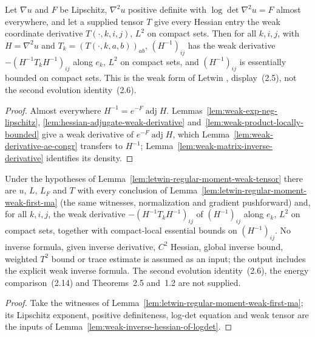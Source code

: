 \begin{lemma}
  \label{lem:weak-inverse-hessian-of-logdet}
  \leanok
  Let $\nabla u$ and $F$ be Lipschitz, $\nabla^2u$ positive definite with $\log\det\nabla^2u=F$ almost everywhere, and let a supplied
  tensor $T$ give every Hessian entry the weak coordinate derivative $T(\cdot,k,i,j)$, $L^2$ on compact sets. Then for all $k,i,j$,
  with $H=\nabla^2u$ and $T_k=(T(\cdot,k,a,b))_{ab}$, $(H^{-1})_{ij}$ has the weak derivative $-(H^{-1}T_kH^{-1})_{ij}$ along $e_k$,
  $L^2$ on compact sets, and $(H^{-1})_{ij}$ is essentially bounded on compact sets. This is the weak form of Letwin
  \cite{Letwin2026QuadraticKLS}, display~(2.5), not the second evolution identity~(2.6).
\end{lemma}
\begin{proof}
  \leanok
  Almost everywhere $H^{-1}=e^{-F}\operatorname{adj}H$. Lemmas~\ref{lem:weak-exp-neg-lipschitz},
  \ref{lem:hessian-adjugate-weak-derivative} and~\ref{lem:weak-product-locally-bounded} give a weak derivative of $e^{-F}\operatorname{adj}H$,
  which Lemma~\ref{lem:weak-derivative-ae-congr} transfers to $H^{-1}$; Lemma~\ref{lem:weak-matrix-inverse-derivative} identifies its
  density.
\end{proof}

\begin{lemma}
  \label{lem:letwin-regular-moment-weak-inverse}
  \leanok
  Under the hypotheses of Lemma~\ref{lem:letwin-regular-moment-weak-tensor} there are $u$, $L$, $L_F$ and $T$ with every conclusion of
  Lemma~\ref{lem:letwin-regular-moment-weak-first-ma} (the same witnesses, normalization and gradient pushforward) and, for all
  $k,i,j$, the weak derivative $-(H^{-1}T_kH^{-1})_{ij}$ of $(H^{-1})_{ij}$ along $e_k$, $L^2$ on compact sets, together with
  compact-local essential bounds on $(H^{-1})_{ij}$. No inverse formula, given inverse derivative, $C^2$ Hessian, global inverse bound,
  weighted $T^2$ bound or trace estimate is assumed as an input; the output includes the explicit weak inverse formula. The second
  evolution identity~(2.6), the energy comparison~(2.14) and
  Theorems~2.5 and~1.2 are not supplied.
\end{lemma}
\begin{proof}
  \leanok
  Take the witnesses of Lemma~\ref{lem:letwin-regular-moment-weak-first-ma}; its Lipschitz exponent, positive definiteness, log-det
  equation and weak tensor are the inputs of Lemma~\ref{lem:weak-inverse-hessian-of-logdet}.
\end{proof}

